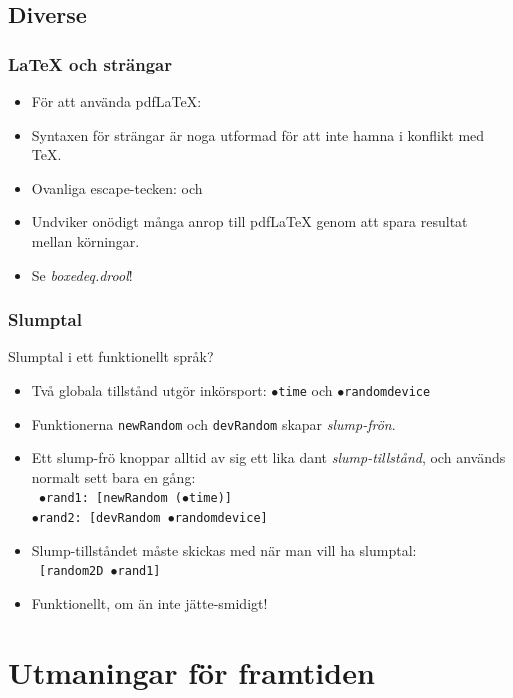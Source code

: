 \documentclass[noamsthm,handout]{beamer}
\begin{document}
\subsection{Diverse}
\begin{frame}\frametitle{\LaTeX{} och strängar}
  \begin{itemize}
  \item För att använda pdf\LaTeX{}:\\
  \item Syntaxen för strängar är noga utformad för att inte hamna i konflikt med \TeX{}.
  \item Ovanliga escape-tecken: \texttt{\cent} och \texttt{\currency}
  \item Undviker onödigt många anrop till pdf\LaTeX{} genom att spara resultat mellan körningar.
  \item Se \emph{boxedeq.drool}!
  \end{itemize}
\end{frame}
\begin{frame}\frametitle{Slumptal}
  Slumptal i ett funktionellt språk?
  \begin{itemize}
  \item Två globala tillstånd utgör inkörsport: \texttt{$\bullet$time} och \texttt{$\bullet$randomdevice}
  \item Funktionerna \texttt{newRandom} och \texttt{devRandom} skapar \emph{slump-frön}.
  \item Ett slump-frö knoppar alltid av sig ett lika dant \emph{slump-tillstånd}, och används normalt sett bara en gång:\\
    \texttt{%
      $\bullet$rand1: [newRandom ($\bullet$time)]\\
      $\bullet$rand2: [devRandom $\bullet$randomdevice]
    }
  \item Slump-tillståndet måste skickas med när man vill ha slumptal:\\
    \texttt{%
      [random2D $\bullet$rand1]
    }
  \item Funktionellt, om än inte jätte-smidigt!
  \end{itemize}
\end{frame}

\section{Utmaningar för framtiden}
\end{document}
